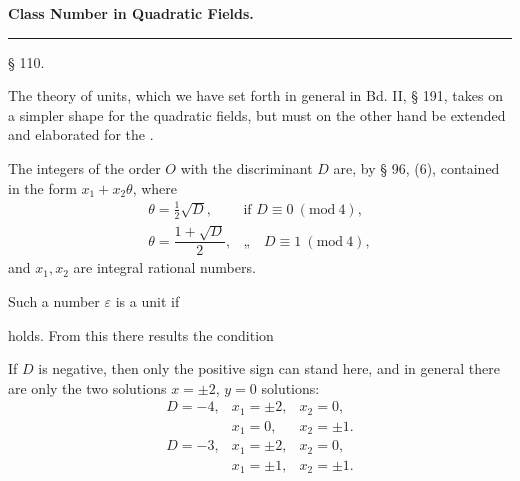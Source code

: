 \begin{center}

\vspace{1em}

\textbf{Class Number in Quadratic Fields.}

\vspace{0.5em}
\rule{4cm}{0.4pt}
\end{center}

\begin{center}
§ 110. 
\end{center}

The theory of units, which we have set forth in general in Bd. II,
§ 191, takes on a simpler shape for the quadratic fields, but must on
the other hand be extended and elaborated for the .

The integers of the order $O$ with the discriminant $D$ are, by
§ 96, (6), contained in the form $x_1 + x_2\theta$, where
\[
\begin{array}{ll}
\theta = \tfrac{1}{2}\sqrt{D}, & \text{if } D \equiv 0 \ (\mathrm{mod}\ 4),\\[4pt]
\theta = \dfrac{1+\sqrt{D}}{2}, & \text{„}\quad D \equiv 1 \ (\mathrm{mod}\ 4),
\end{array}
\]
and $x_1, x_2$ are integral rational numbers.

Such a number $\varepsilon$ is a unit if


holds. From this there results the condition


If $D$ is negative, then only the positive sign can stand here, and in
general there are only the two solutions $x = \pm 2$,
$y = 0$ %
solutions:
\[
\begin{array}{lll}
D = -4, & x_1 = \pm 2, & x_2 = 0,\\
 & x_1 = 0, & x_2 = \pm 1.\\
D = -3, & x_1 = \pm 2, & x_2 = 0,\\
 & x_1 = \pm 1, & x_2 = \pm 1.
\end{array}
\]
